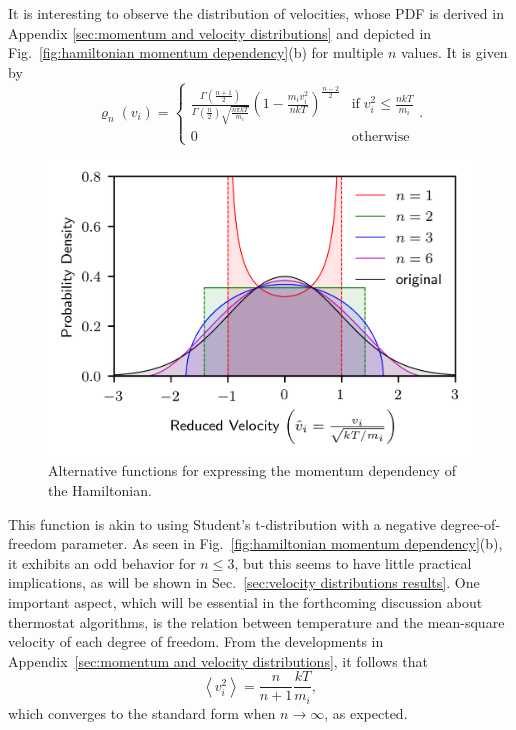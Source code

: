 \documentclass[
aip,
jcp,
reprint,
]{revtex4-1}
\begin{document}
It is interesting to observe the distribution of velocities, whose PDF is derived in Appendix \ref{sec:momentum and velocity distributions} and depicted in Fig.~\ref{fig:hamiltonian momentum dependency}(b) for multiple $n$ values.
It is given by
\begin{equation*}
\label{eq:velocity distribution}
\varrho_n(v_i) =
\begin{cases}
\frac{\Gamma\left(\frac{n+1}{2}\right)}{\Gamma\left(\frac{n}{2}\right) \sqrt{\frac{n \pi k T}{m_i}}} \left(1-\frac{m_i v_i^2}{n k T}\right)^{\frac{n-2}{2}} & \mathrm{if} \; v_i^2 \leq \frac{n k T}{m_i} \\
0 & \mathrm{otherwise}
\end{cases}.
\end{equation*}

\begin{figure}
	\centering
	\includegraphics{velocity_distributions}
	\caption{Alternative functions for expressing the momentum dependency of the Hamiltonian.}
	\label{fig:individual momentum distributions}
\end{figure}

This function is akin to using Student's t-distribution with a negative degree-of-freedom parameter.
As seen in Fig.~\ref{fig:hamiltonian momentum dependency}(b), it exhibits an odd behavior for $n \leq 3$, but this seems to have little practical implications, as will be shown in Sec.~\ref{sec:velocity distributions results}.
One important aspect, which will be essential in the forthcoming discussion about thermostat algorithms, is the relation between temperature and the mean-square velocity of each degree of freedom.
From the developments in Appendix~\ref{sec:momentum and velocity distributions}, it follows that
\begin{equation}
\label{eq:mean-square velocity}
\left\langle v_i^2 \right\rangle = \frac{n}{n+1} \frac{kT}{m_i},
\end{equation}
which converges to the standard form when $n \to \infty$, as expected.
\end{document}
